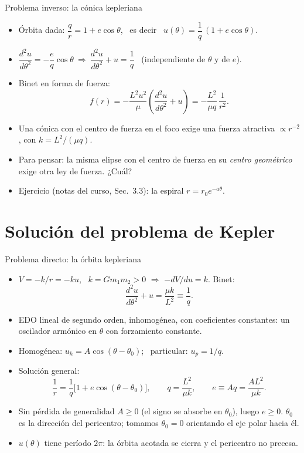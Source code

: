 \documentclass[spanish]{beamer}
\begin{document}
\begin{frame}{Problema inverso: la cónica kepleriana}
\begin{itemize}
\item<1-> Órbita dada: $\dfrac{q}{r}=1+e\cos\theta$, \ es decir \ $u(\theta)=\dfrac1q\,(1+e\cos\theta)$.
\item<2-> $\dfrac{d^2u}{d\theta^2}=-\dfrac{e}{q}\cos\theta \ \Rightarrow\ \dfrac{d^2u}{d\theta^2}+u=\dfrac1q$ \ (independiente de $\theta$ y de $e$).
\item<3-> Binet en forma de fuerza:
\[ f(r)=-\frac{L^2u^2}{\mu}\left(\frac{d^2u}{d\theta^2}+u\right)=-\frac{L^2}{\mu q}\,\frac{1}{r^2}. \]
\item<4-> Una cónica con el centro de fuerza en el foco exige una fuerza atractiva $\propto r^{-2}$, con $k=L^2/(\mu q)$.
\item<5-> Para pensar: la misma elipse con el centro de fuerza en su \emph{centro geométrico} exige otra ley de fuerza. ¿Cuál?
\item<6-> Ejercicio (notas del curso, Sec.~3.3): la espiral $r=r_0e^{-a\theta}$.
\end{itemize}
\end{frame}

\section{Solución del problema de Kepler}
\begin{frame}{Problema directo: la órbita kepleriana}
\begin{itemize}
\item<1-> $V=-k/r=-ku$, \ $k=Gm_1m_2>0$ $\Rightarrow$ $-dV/du=k$. Binet:
\[\frac{d^2u}{d\theta^2}+u=\frac{\mu k}{L^2}\equiv\frac1q .\]
\item<2-> EDO lineal de segundo orden, inhomogénea, con coeficientes constantes: un oscilador armónico en $\theta$ con forzamiento constante.
\item<3-> Homogénea: $u_h=A\cos(\theta-\theta_0)$; \ particular: $u_p=1/q$.
\item<4-> Solución general:
\[\frac1r=\frac1q\big[1+e\cos(\theta-\theta_0)\big],\qquad q=\frac{L^2}{\mu k},\qquad e\equiv Aq=\frac{AL^2}{\mu k}.\]
\item<5-> Sin pérdida de generalidad $A\ge0$ (el signo se absorbe en $\theta_0$), luego $e\ge0$. $\theta_0$ es la dirección del pericentro; tomamos $\theta_0=0$ orientando el eje polar hacia él.
\item<6-> $u(\theta)$ tiene período $2\pi$: la órbita acotada se cierra y el pericentro \alert{no precesa}.
\end{itemize}
\end{frame}
\end{document}
